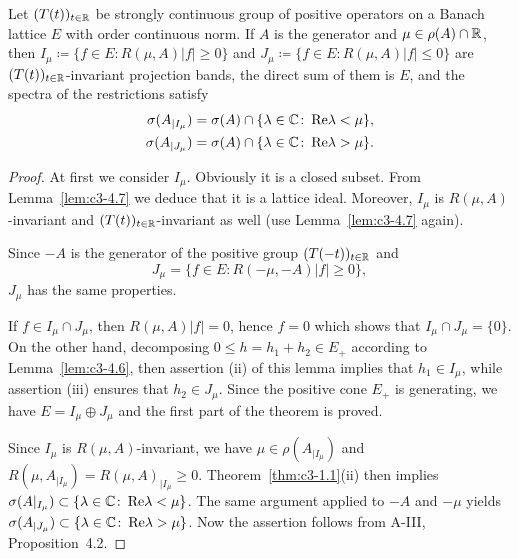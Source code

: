 \begin{theorem} \label{thm:c3-4.8}
Let $(T(t))_{t \in \mathbb{R} }$ be strongly continuous group of positive
operators on a Banach lattice $E$ with order continuous norm.
If $A$ is the generator and $\mu \in \rho(A) \cap \mathbb{R} $, then
$I_{\mu} \coloneqq  \{f \in E \colon R(\mu,A)|f| \geq 0\}$ and $J_{\mu} \coloneqq  \{f \in E \colon R(\mu,A)|f| \leq 0\}$
are $(T(t))_{t \in \mathbb{R} }$-invariant projection bands, 
the direct sum of them is $E$, and the spectra of the restrictions satisfy
\begin{align*}
	\sigma(A_{|I_{\mu}}) &= \sigma(A) \cap \{\lambda \in \mathbb{C}  \colon \mathop{}\!\mathrm{Re}  \lambda < \mu\} ,\\
	\sigma(A_{|J_{\mu}}) &= \sigma(A) \cap \{\lambda \in \mathbb{C}  \colon \mathop{}\!\mathrm{Re}  \lambda > \mu\} .
\end{align*}
\end{theorem}
\begin{proof}
At first we consider $I_{\mu}$. Obviously it is a closed subset.
From Lemma~\ref{lem:c3-4.7} we deduce that it is a lattice ideal. Moreover, $I_{\mu}$
is $R(\mu,A)$-invariant and $(T(t))_{t \in \mathbb{R} }$-invariant as well (use Lemma~\ref{lem:c3-4.7}
again).

Since $-A$ is the generator of the positive group $(T(-t))_{t \in \mathbb{R} }$ and
%
\[
	 J_{\mu} = \{f \in E \colon R(-\mu,-A)|f| \geq 0\} ,
\]
%
$J_{\mu}$ has the same properties.

If $f \in I_{\mu} \cap J_{\mu}$, then $R(\mu,A)|f| = 0$, hence $f = 0$ which shows that
$I_{\mu} \cap J_{\mu} = \{0\}$. On the other hand, decomposing $0 \leq h = h_1 + h_2 \in E_+$
according to Lemma~\ref{lem:c3-4.6}, then assertion (ii) of this lemma implies
that $h_1 \in I_{\mu}$, while assertion (iii) ensures that $h_2 \in J_{\mu}$. Since the
positive cone $E_+$ is generating, we have $E = I_{\mu} \oplus J_{\mu}$ and the first part
of the theorem is proved.

Since $I_{\mu}$ is $R(\mu,A)$-invariant, we have $\mu \in \rho(A_{|I_{\mu}})$ and
$R(\mu,A_{|I_{\mu}}) = R(\mu,A)_{|I_{\mu}} \geq 0$. Theorem~\ref{thm:c3-1.1}(ii) then implies
$\sigma(A|_{I_{\mu}}) \subset \{\lambda \in \mathbb{C}  \colon \mathop{}\!\mathrm{Re}  \lambda < \mu\}$. The same argument applied to $-A$ and
$-\mu$ yields $\sigma(A_{|J_{\mu}}) \subset \{\lambda \in \mathbb{C}  \colon \mathop{}\!\mathrm{Re}  \lambda > \mu\}$. Now the assertion follows
from A-III, Proposition~4.2.
\end{proof}


